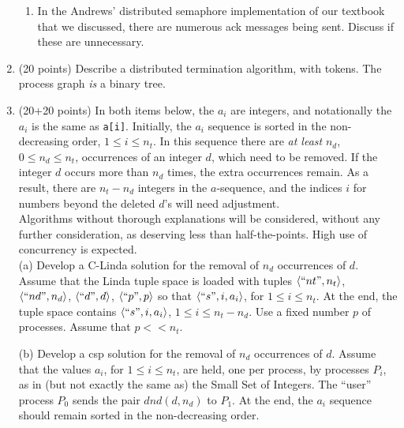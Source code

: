 \documentclass[12pt]{article}
\def\CSP{{\sc csp}}
\def\lb{\langle}
\def\rb{\rangle}
\begin{document}
\begin{enumerate}
\begin{enumerate}
\item
In the Andrews' distributed semaphore implementation of our textbook
that we discussed, there are numerous {\sc ack} messages being sent.
Discuss if these are unnecessary.
\end{enumerate}


\item (20 points)
Describe a distributed termination algorithm, with tokens.
The process graph {\em is} a binary tree.

\item (20+20 points) In both items below, the $a_i$ are integers, and
notationally the $a_i$ is the same as {\tt a[i]}.  Initially, the
$a_i$ sequence is sorted in the non-decreasing order, $1 \le i \le
n_t$.  In this sequence there are {\em at least} $n_d$, $0 \le n_d \le
n_t$, occurrences of an integer $d$, which need to be removed.  If the
integer $d$ occurs more than $n_d$ times, the extra occurrences
remain.  As a result, there are $n_t - n_d$ integers in the
$a$-sequence, and the indices $i$ for numbers beyond the deleted $d$'s
will need adjustment.  \\

Algorithms without thorough explanations will be considered, without
any further consideration, as deserving less than half-the-points.
High use of concurrency is expected.\\

(a) Develop a C-Linda solution for the removal of $n_d$ occurrences of
$d$.  Assume that the Linda tuple space is loaded with tuples $\lb
``nt", n_t \rb$, $\lb ``nd", n_d \rb$, $\lb ``d", d \rb$, $\lb ``p", p
\rb$ so that $\lb ``s", i, a_i \rb$, for $1 \le i \le n_t$.  At the
end, the tuple space contains $\lb ``s", i, a_i \rb$, $1 \le i \le n_t
- n_d$.  Use a fixed number $p$ of processes.  Assume that $p << n_t$.

(b) Develop a {\CSP} solution for the removal of $n_d$
occurrences of $d$.  Assume that the values $a_i$, for $1 \le i \le
n_t$, are held, one per process, by processes $P_i$, as in (but not
exactly the same as) the Small Set of Integers.  The ``user'' process
$P_0$ sends the pair $dnd(d, n_d)$ to $P_1$.  At the end, the $a_i$
sequence should remain sorted in the non-decreasing order.  

\end{enumerate}
\end{document}
